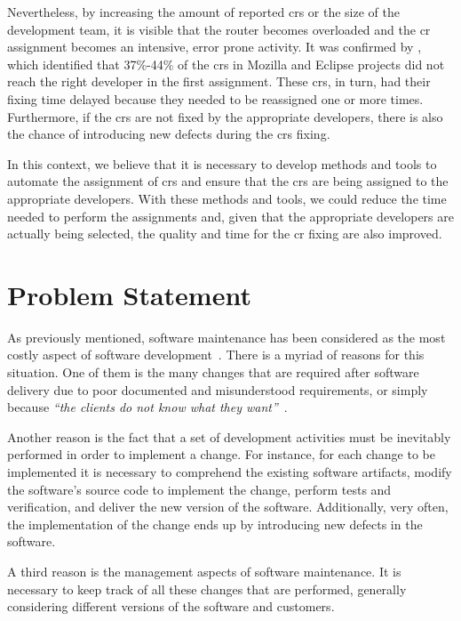 \lipsum[2-4]

Nevertheless, by increasing the amount of reported \acp{cr} or the size of the
development team, it is visible that the router becomes overloaded and the
\ac{cr} assignment becomes an intensive, error prone activity. It was confirmed
by \citet{Jeong2009}, which identified that 37\%-44\% of the \acp{cr} in Mozilla
and Eclipse projects did not reach the right developer in the first assignment.
These \acp{cr}, in turn, had their fixing time delayed because they needed to be
reassigned one or more times. Furthermore, if the \acp{cr} are not fixed by the
appropriate developers, there is also the chance of introducing new defects
during the \acp{cr} fixing.

In this context, we believe that it is necessary to develop methods and tools to
automate the assignment of \acp{cr} and ensure that the \acp{cr} are being
assigned to the appropriate developers. With these methods and tools, we could
reduce the time needed to perform the assignments and, given that the
appropriate developers are actually being selected, the quality and time for the
\ac{cr} fixing are also improved.

\section{Problem Statement}
\label{sec:intro-problem-statement}

As previously mentioned, software maintenance has been considered as the most
costly aspect of software development~\citep{swebok2004}. There is a myriad of
reasons for this situation. One of them is the many changes that are required
after software delivery due to poor documented and misunderstood requirements,
or simply because \emph{``the clients do not know what they
want''}~\citep{Brooks1995}.

Another reason is the fact that a set of development activities must be
inevitably performed in order to implement a change. For instance, for each
change to be implemented it is necessary to comprehend the existing software
artifacts, modify the software's source code to implement the change, perform
tests and verification, and deliver the new version of the software.
Additionally, very often, the implementation of the change ends up by
introducing new defects in the software.
   
A third reason is the management aspects of software maintenance. It is
necessary to keep track of all these changes that are performed, generally
considering different versions of the software and customers.

